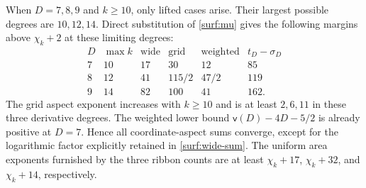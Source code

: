 \documentclass[11pt]{amsart}
\theoremstyle{definition}
\theoremstyle{remark}
\numberwithin{equation}{section}
\begin{document}
When $D=7,8,9$ and $k\ge10$, only lifted cases arise. Their largest possible degrees are $10,12,14$. Direct substitution of \eqref{surf:mu} gives the following margins above $\chi_k+2$ at these limiting degrees:
\[
\begin{array}{c|c|cccc}
D&\max k&\text{wide}&\text{grid}&\text{weighted}&t_D-\sigma_D\\\hline
7&10&17&30&12&85\\
8&12&41&115/2&47/2&119\\
9&14&82&100&41&162.
\end{array}
\]
The grid aspect exponent increases with $k\ge10$ and is at least $2,6,11$ in these three derivative degrees. The weighted lower bound $\mathsf{v}(D)-4D-5/2$ is already positive at $D=7$. Hence all coordinate-aspect sums converge, except for the logarithmic factor explicitly retained in \eqref{surf:wide-sum}. The uniform area exponents furnished by the three ribbon counts are at least $\chi_k+17$, $\chi_k+32$, and $\chi_k+14$, respectively.
\end{document}
